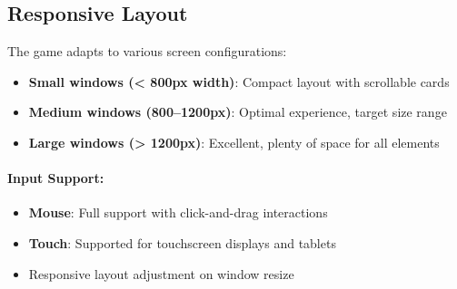 \subsection{Responsive Layout}
\label{subsec:responsive-layout}

The game adapts to various screen configurations:

\begin{itemize}
    \item \textbf{Small windows (< 800px width)}: Compact layout with scrollable cards
    \item \textbf{Medium windows (800--1200px)}: Optimal experience, target size range
    \item \textbf{Large windows (> 1200px)}: Excellent, plenty of space for all elements
\end{itemize}

\paragraph*{Input Support:}

\begin{itemize}
    \item \textbf{Mouse}: Full support with click-and-drag interactions
    \item \textbf{Touch}: Supported for touchscreen displays and tablets
    \item Responsive layout adjustment on window resize
\end{itemize}



